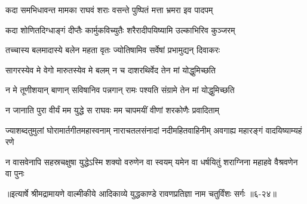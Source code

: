 \twolineshloka
{कदा समभिधावन्त मामका राघवं शराः}
{वसन्ते पुष्पितं मत्ता भ्रमरा इव पादपम्} %

\twolineshloka
{कदा शोणितदिग्धाङ्गं दीप्तैः कार्मुकविच्युतैः}
{शरैरादीपयिष्यामि उल्काभिरिव कुञ्जरम्} %

\twolineshloka
{तच्चास्य बलमादास्ये बलेन महता वृतः}
{ज्योतिषामिव सर्वेषां प्रभामुद्यन् दिवाकरः} %

\twolineshloka
{सागरस्येव मे वेगो मारुतस्येव मे बलम्}
{न च दाशरथिर्वेद तेन मां योद्धुमिच्छति} %

\twolineshloka
{न मे तूणीशयान् बाणान् सविषानिव पन्नगान्}
{रामः पश्यति संग्रामे तेन मां योद्धुमिच्छति} %

\twolineshloka
{न जानाति पुरा वीर्यं मम युद्धे स राघवः}
{मम चापमयीं वीणां शरकोणैः प्रवादिताम्} %

\threelineshloka
{ज्याशब्दतुमुलां घोरामार्तगीतमहास्वनाम्}
{नाराचतलसंनादां नदीमहितवाहिनीम्}
{अवगाह्य महारङ्गं वादयिष्याम्यहं रणे} %

\twolineshloka
{न वासवेनापि सहस्रचक्षुषा युद्धेऽस्मि शक्यो वरुणेन वा स्वयम्}
{यमेन वा धर्षयितुं शराग्निना महाहवे वैश्रवणेन वा पुनः} %


॥इत्यार्षे श्रीमद्रामायणे वाल्मीकीये आदिकाव्ये युद्धकाण्डे रावणप्रतिज्ञा नाम चतुर्विंशः सर्गः ॥६-२४॥

